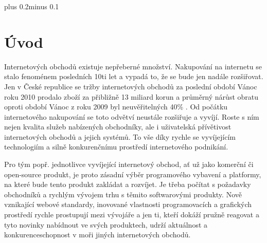 \documentclass[11pt,twoside,a4paper]{book}
\begin{document}

\tableofcontents



\listoffigures



\listoftables



\mainbodystarts
\normalfont
{}\baselineskip plus 0.2\baselineskip minus 0.1\baselineskip



% 
% 

\chapter{Úvod}
Internetových obchodů existuje nepřeberné množství. Nakupování na internetu se stalo fenoménem posledních 10ti let a vypadá to, že se bude jen nadále rozšiřovat. Jen v České republice se tržby internetových obchodů za poslední období Vánoc roku 2010 prodalo zboží za přibližně 13 miliard korun a průměrný nárůst obratu oproti období Vánoc z roku 2009 byl neuvěřitelných 40\% \cite{vanocenainternetu}.  Od počátku internetového nakupování se toto odvětví neustále rozšiřuje a vyvíjí. Roste s ním nejen kvalita služeb nabízených obchodníky, ale i uživatelská přívětivost internetových obchodů a jejich systémů. To vše díky rychle se vyvíjejícím technologiím a silně konkurenčnímu prostředí internetového podnikání.

Pro tým popř. jednotlivce vyvíjející internetový obchod, ať už jako komerční či open-source produkt, je proto zásadní výběr programového vybavení a platformy, na které bude tento produkt zakládat a rozvíjet. Je třeba počítat s požadavky obchodníků a rychlým vývojem trhu s těmito softwarovými produkty. Nově vznikající webové standardy, inovované vlastnosti programovacích a grafických prostředí rychle prostupují mezi vývojáře a jen ti, kteří dokáží pružně reagovat a tyto novinky nabídnout ve svých produktech, udrží aktuálnost a konkurenceschopnost v moři jiných internetových obchodů.
\end{document}
